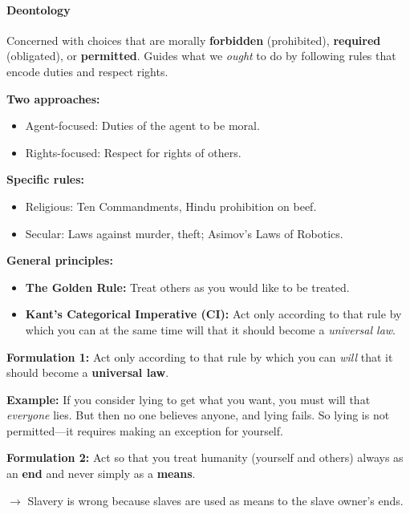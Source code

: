 \separator

\paragraph*{Deontology}

\begin{defbox}[Deontology]
Concerned with choices that are morally \textbf{forbidden} (prohibited), \textbf{required} (obligated), or \textbf{permitted}. Guides what we \textit{ought} to do by following rules that encode duties and respect rights.

\textbf{Two approaches:}
\begin{itemize}
  \item Agent-focused: Duties of the agent to be moral.
  \item Rights-focused: Respect for rights of others.
\end{itemize}
\end{defbox}

\begin{exbox}
\textbf{Specific rules:}
\begin{itemize}
  \item Religious: Ten Commandments, Hindu prohibition on beef.
  \item Secular: Laws against murder, theft; Asimov's Laws of Robotics.
\end{itemize}

\textbf{General principles:}
\begin{itemize}
  \item \textbf{The Golden Rule:} Treat others as you would like to be treated.
  \item \textbf{Kant's Categorical Imperative (CI):} Act only according to that rule by which you can at the same time will that it should become a \textit{universal law}.
\end{itemize}
\end{exbox}

\begin{defbox}
\textbf{Formulation 1:} Act only according to that rule by which you can \textit{will} that it should become a \textbf{universal law}.

\textbf{Example:} If you consider lying to get what you want, you must will that \textit{everyone} lies. But then no one believes anyone, and lying fails. So lying is not permitted---it requires making an exception for yourself.

\textbf{Formulation 2:} Act so that you treat humanity (yourself and others) always as an \textbf{end} and never simply as a \textbf{means}.

$\to$ Slavery is wrong because slaves are used as means to the slave owner's ends.
\end{defbox}

